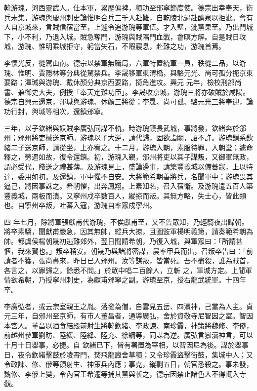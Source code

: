 \begin{pinyinscope}
 韓游瑰，河西靈武人。仕本軍，累歷偏裨，積功至邠寧節度使。德宗出幸奉天，衛兵未集，游瑰與慶州刺史論惟明合兵三千人赴難，自乾陵北過赴醴泉以拒泚。會有
 人自京城來，言賊信宿當至，上遽令追游瑰等軍伍。才入壁，泚黨果至。乃出鬥城下，小不利，乃退入城。賊急奪門，游瑰與賊隔門血戰，會暝方解。自是賊日攻城，游瑰、惟明乘城拒守，躬當矢石，不暇寢息，赴難之功，游瑰首焉。



 李懷光反，從駕山南。德宗以禁軍無職局，六軍特置統軍一員，秩從二品，以游瑰、惟明、賈隱林等分典從駕禁兵。李晟移軍東渭橋，與駱元光、尚可孤分扼京東要路；渾瑊與游瑰、戴休顏分典京西要路，掎角進攻。興元
 元年，檢校刑部尚書、兼御史大夫，例授「奉天定難功臣」。李晟收京城，游瑰三將亦破賊於咸陽。德宗自興元還京，渾瑊與游瑰、休顏三將從；李晟、尚可孤、駱元光三將奉迎，論功行封，與瑊等相次，還鎮邠寧。



 三年，以子欽緒與妖賊李廣弘同謀不軌，時游瑰鎮長武城，事將發，欽緒奔於邠州；邠州將吏械送京師。游瑰以子大逆，請代歸，固欲詣闕，詔不許。游瑰鎖系欽緒二子送京師，請從坐，上亦宥之。十二月，游瑰入朝，素服待罪，入朝堂；遽命
 釋之，勞遇如故，復令還鎮。初，游瑰入覲，邠州將吏以其子謀叛，又御軍無政，謂必受代，餞送之禮甚薄。及游瑰見上，盛論邊事，請築豐義城以備蕃寇，上以特達，委用如初。及還鎮，軍中懼不自安。大將範希朝善將兵，名聞軍中；游瑰畏其逼己，將因事誅之。希朝懼，出奔鳳翔。上素知名，召入宿衛。及游瑰遣五百人築豐義城，兩板而潰。又寧州戍卒數百人，縱掠而叛。其無方略，失士心，皆此類也。自寧州卒叛，吐蕃入寇，游瑰自率眾戍寧州。



 四
 年七月，除將軍張獻甫代游瑰，不俟獻甫至，又不告眾知，乃輕騎夜出歸朝。將卒素驕，聞獻甫嚴急，因其無帥，縱兵大掠，且圍監軍楊明義第，請奏範希朝為帥。都虞侯楊朝晟初逃難郊外，翌日聞請希朝，乃復入城，與軍眾曰：「所請甚愜，我來賀也。」叛卒稍安。朝晟乃與諸將密謀，晨率甲兵而出，召叛卒告曰：「前請者不獲，張尚書來，昨日已入邠州。汝等謀叛，皆當死。吾不盡殺，誰為賊首，各言之，以罪歸之，餘悉不問。」於眾中唱二百餘人，立斬
 之，軍城方定。上聞軍情欲希朝，乃授寧州刺史，為獻甫邠寧之副。游瑰至京，授右龍武統軍。十四年卒。



 李廣弘者，或云宗室親王之胤。落發為僧，自雲見五岳、四瀆神，己當為人主。貞元三年，自邠州至京師，有市人董昌者，通導廣弘，舍於資敬寺尼智因之室。智因本宮人。董昌以酒食結殿前射生將韓欽緒、李政諫、南珍霞，神策將魏修、李傪，前越州參軍劉昉、陸緩、陸絳、陸充、徐綱等，同謀為逆。廣弘言嶽瀆神言，可以十月十日舉事，必捷。自
 欽緒已下，皆有署置為宰相，以智因尼為後。謀於舉事日，夜令欽緒擊鼓於凌霄門，焚飛龍廄舍草積；又令珍霞盜擊街鼓，集城中人；又令政諫、修、傪等領射生、神策兵內應；事克，縱剽五日，朝官悉殺之。事未發，魏修、李傪上變，令內官王希遷等捕其黨與斬之，德宗因禁止諸色人不得輒入寺觀。




\end{pinyinscope}
